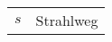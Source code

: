 \begin{table}[h]
    \begin{tabular}{@{}ll@{}}
        $s$ & Strahlweg\\      
    \end{tabular}
    \label{tab:glossar}
\end{table}